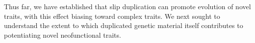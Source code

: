


Thus far, we have established that slip duplication can promote evolution of novel traits, with this effect biasing toward complex traits.
We next sought to understand the extent to which duplicated genetic material itself contributes to potentiating novel neofunctional traits.

